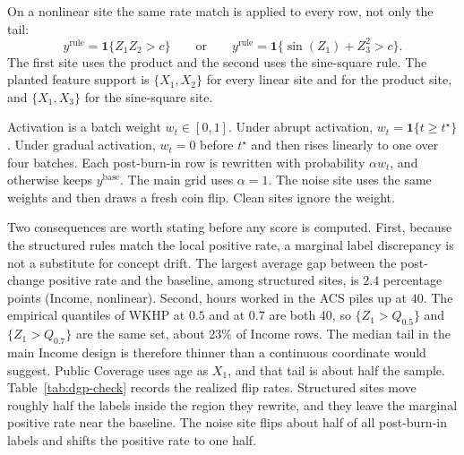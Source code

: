 On a nonlinear site the same rate match is applied to every row, not only
the tail:
\begin{equation}
\label{eq:nonlinear-rule}
y^{\mathrm{rule}}
=
\mathbf{1}\{Z_1 Z_2>c\}
\qquad\text{or}\qquad
y^{\mathrm{rule}}
=
\mathbf{1}\{\sin(Z_1)+Z_3^2>c\}.
\end{equation}
The first site uses the product and the second uses the sine-square rule.
The planted feature support is $\{X_1,X_2\}$ for every linear site and for
the product site, and $\{X_1,X_3\}$ for the sine-square site.

Activation is a batch weight $w_t\in[0,1]$.
Under abrupt activation, $w_t=\mathbf{1}\{t\ge t^\star\}$.
Under gradual activation, $w_t=0$ before $t^\star$ and then rises linearly
to one over four batches.
Each post-burn-in row is rewritten with probability $\alpha w_t$, and
otherwise keeps $y^{\mathrm{base}}$.
The main grid uses $\alpha=1$.
The noise site uses the same weights and then draws a fresh coin flip.
Clean sites ignore the weight.

Two consequences are worth stating before any score is computed.
First, because the structured rules match the local positive rate, a
marginal label discrepancy is not a substitute for concept drift.
The largest average gap between the post-change positive rate and the
baseline, among structured sites, is $2.4$ percentage points
(Income, nonlinear).
Second, hours worked in the ACS piles up at $40$.
The empirical quantiles of WKHP at $0.5$ and at $0.7$ are both $40$, so
$\{Z_1>Q_{0.5}\}$ and $\{Z_1>Q_{0.7}\}$ are the same set, about $23\%$ of
Income rows.
The median tail in the main Income design is therefore thinner than a
continuous coordinate would suggest.
Public Coverage uses age as $X_1$, and that tail is about half the sample.
Table~\ref{tab:dgp-check} records the realized flip rates.
Structured sites move roughly half the labels inside the region they
rewrite, and they leave the marginal positive rate near the baseline.
The noise site flips about half of all post-burn-in labels and shifts the
positive rate to one half.

